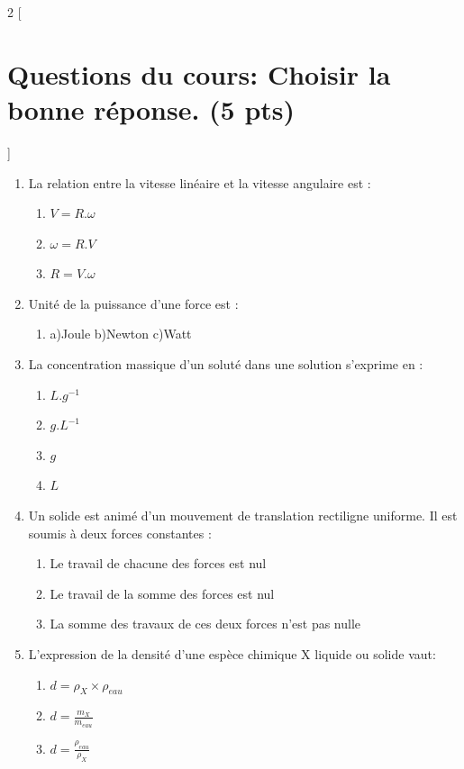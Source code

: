 \documentclass[12pt]{article}
\begin{document}
\begin{multicols}{2}
    [
        \section*{Questions du cours: Choisir la bonne réponse. (5 pts)}
    ]

\begin{enumerate}
  \item La relation entre la vitesse linéaire et la vitesse angulaire est :
      \begin{enumerate}
          \item $V = R.\omega$\sloppy
          \item $\omega = R.V$\nolinebreak
          \item $R = V.\omega$
      \end{enumerate}

  \item  Unité de la puissance d’une force est :
      \begin{enumerate}
          \item[] a)Joule \hspace{1cm}  b)Newton  \hspace{1cm}c)Watt
      \end{enumerate}

     \item  La concentration massique d'un soluté dans une solution s'exprime en :
      \begin{enumerate}
          \item $L.g^{-1}$
          \item $g.L^{-1}$
          \item $g$
          \item $L$
      \end{enumerate}
        \vspace{1cm}
 \item  Un solide est animé d’un mouvement de translation rectiligne uniforme. Il est soumis à deux
forces constantes :
      \begin{enumerate}
          \item  Le travail de chacune des forces est nul 
          \item Le travail de la somme des forces est nul
          \item La somme des travaux de ces deux forces n’est pas nulle
      \end{enumerate}

 \item  L'expression de la densité d'une espèce chimique X liquide ou solide vaut: 
      \begin{enumerate}
          \item $d = \rho_X \times \rho_{eau}$
          \item $d = \frac{m_X }{m_{eau}}$
          \item $d = \frac{\rho_{eau}}{\rho_{X}}$  
      \end{enumerate}

\end{enumerate}
\end{multicols}
\end{document}
